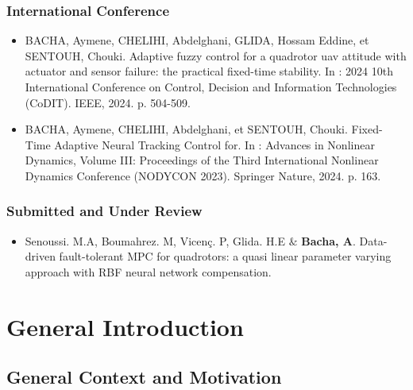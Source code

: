     \subsection*{International Conference}
    \begin{itemize}
    \item[1.]  BACHA, Aymene, CHELIHI, Abdelghani, GLIDA, Hossam Eddine, et SENTOUH, Chouki. Adaptive fuzzy control for a quadrotor uav attitude with actuator and sensor failure: the practical fixed-time stability. In : 2024 10th International Conference on Control, Decision and Information Technologies (CoDIT). IEEE, 2024. p. 504-509.
    \item[2.] BACHA, Aymene, CHELIHI, Abdelghani, et SENTOUH, Chouki. Fixed-Time Adaptive Neural Tracking Control for. In : Advances in Nonlinear Dynamics, Volume III: Proceedings of the Third International Nonlinear Dynamics Conference (NODYCON 2023). Springer Nature, 2024. p. 163. 
\end{itemize}
\subsection*{Submitted and Under Review}
\begin{itemize}
    \item[1.] Senoussi. M.A, Boumahrez. M, Vicenç. P, Glida. H.E $\&$ \textbf{Bacha, A}. Data-driven fault-tolerant MPC for quadrotors: a quasi linear parameter varying approach with RBF neural network compensation. %
\end{itemize}
\chapter{General Introduction}
\label{chap:introduction}

\section{General Context and Motivation}
\label{sec:general_context}

